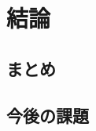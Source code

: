 \chapter{結論}
\label{chap:conclusion}

\section{まとめ}
\label{sec:summary}

\section{今後の課題}
\label{sec:future-work}
